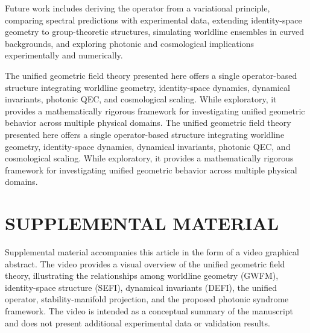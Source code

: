 \documentclass[aip,jmp,reprint,onecolumn,nofootinbib]{revtex4-2}
\begin{document}
Future work includes deriving the operator from a variational principle, comparing spectral 
predictions with experimental data, extending identity-space geometry to group-theoretic 
structures, simulating worldline ensembles in curved backgrounds, and exploring photonic 
and cosmological implications experimentally and numerically.

The unified geometric field theory presented here offers a single operator-based structure 
integrating worldline geometry, identity-space dynamics, dynamical invariants, photonic 
QEC, and cosmological scaling. While exploratory, it provides a mathematically rigorous 
framework for investigating unified geometric behavior across multiple physical domains.
The unified geometric field theory presented here offers a single operator-based structure 
integrating worldline geometry, identity-space dynamics, dynamical invariants, photonic 
QEC, and cosmological scaling. While exploratory, it provides a mathematically rigorous 
framework for investigating unified geometric behavior across multiple physical domains.

\section*{SUPPLEMENTAL MATERIAL} Supplemental material accompanies this article in the form of a video graphical abstract. The video provides a visual overview of the unified geometric field theory, illustrating the relationships among worldline geometry (GWFM), identity-space structure (SEFI), dynamical invariants (DEFI), the unified operator, stability-manifold projection, and the proposed photonic syndrome framework. The video is intended as a conceptual summary of the manuscript and does not present additional experimental data or validation results.
\end{document}
